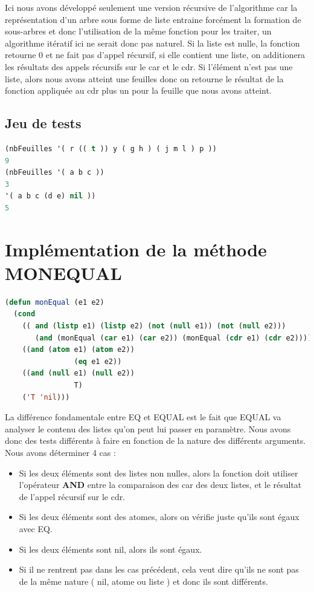 \documentclass[a4paper,10pt]{report}
\begin{document}
	Ici nous avons développé seulement une version récursive de l'algorithme car la représentation d'un arbre sous forme de liste entraine forcément la formation de sous-arbres et donc l'utilisation
	de la même fonction pour les traiter, un algorithme itératif ici ne serait donc pas naturel. Si la liste est nulle, la fonction retourne 0 et ne fait pas d'appel récursif,
	si elle contient une liste, on additionera les résultats des appels récursifs sur le car et le cdr. Si l'élément n'est pas une liste, alors nous avons atteint une feuilles
	donc on retourne le résultat de la fonction appliquée au cdr plus un pour la feuille que nous avons atteint.
	  \subsection{Jeu de tests}
	\begin{lstlisting}[language=Lisp]
(nbFeuilles '( r (( t )) y ( g h ) ( j m l ) p ))
9
(nbFeuilles '( a b c ))
3
'( a b c (d e) nil ))
5
	\end{lstlisting}\newpage
	\section{Implémentation de la méthode MONEQUAL}
	  \begin{lstlisting}[language=Lisp]
(defun monEqual (e1 e2)
  (cond 
    (( and (listp e1) (listp e2) (not (null e1)) (not (null e2)))
       (and (monEqual (car e1) (car e2)) (monEqual (cdr e1) (cdr e2))))
    ((and (atom e1) (atom e2))
                (eq e1 e2))
    ((and (null e1) (null e2))
                T)
    ('T 'nil)))
	  \end{lstlisting}

	  La différence fondamentale entre EQ et EQUAL est le fait que EQUAL va analyser le contenu des listes qu'on peut lui passer en paramètre. Nous avons donc des tests différents
	  à faire en fonction de la nature des différents arguments. Nous avons déterminer 4 cas :
	  \begin{itemize}
	   \item Si les deux éléments sont des listes non nulles, alors la fonction doit utiliser l'opérateur \textbf{AND} entre la comparaison des car des deux listes, et le résultat de l'appel récursif sur le cdr.
	   \item Si les deux éléments sont des atomes, alors on vérifie juste qu'ils sont égaux avec EQ.
	   \item Si les deux éléments sont nil, alors ils sont égaux.
	   \item Si il ne rentrent pas dans les cas précédent, cela veut dire qu'ils ne sont pas de la même nature ( nil, atome ou liste ) et donc ils sont différents.
	  \end{itemize}
\end{document}
